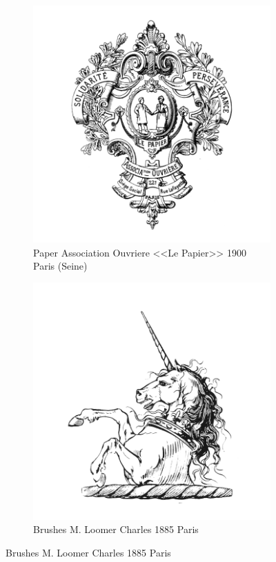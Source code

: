 \begin{figure}[h]
  \begin{subfigure}{.45\textwidth}
    \centering
    \includegraphics[width=.5\linewidth]{images/supplement/trademarks/french/3_11}
    \caption[]{Paper Association Ouvriere <<Le Papier>> 1900 Paris (Seine)}
    \label{fig:trademarks:french:3.11}
  \end{subfigure}\hfill
  \begin{subfigure}{.45\textwidth}
    \centering
    \includegraphics[width=.5\linewidth]{images/supplement/trademarks/french/4_1}
    \caption[]{Brushes M. Loomer Charles 1885 Paris}
    \label{fig:trademarks:french:4.1}
  \end{subfigure}


\end{figure}
